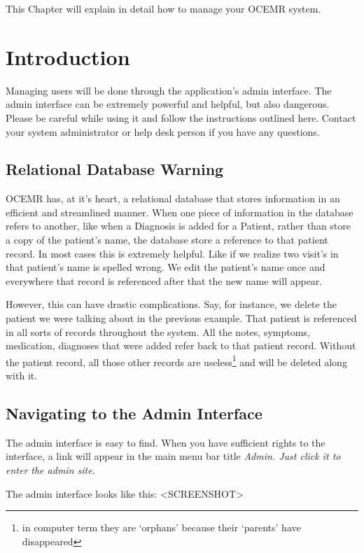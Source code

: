 This Chapter will explain in detail how to manage your OCEMR system.

\section{Introduction}

Managing users will be done through the application’s admin interface.
The admin interface can be extremely powerful and helpful, but also
dangerous. Please be careful while using it and follow the instructions
outlined here. Contact your system administrator or help desk person if
you have any questions.

\subsection{Relational Database Warning}

  OCEMR has, at it’s heart, a relational database that stores information
in an efficient and streamlined manner. When one piece of information in
the database refers to another, like when a Diagnosis is added for a Patient,
rather than store a copy of the patient’s name, the database store a reference
to that patient record. In most cases this is extremely helpful. Like if we
realize two visit’s in that patient’s name is spelled wrong. We edit the
patient’s name once and everywhere that record is referenced after that the
new name will appear.

  However, this can have drastic complications. Say, for instance, we delete
the patient we were talking about in the previous example. That patient is
referenced in all sorts of records throughout the system. All the notes,
symptoms, medication, diagnoses that were added refer back to that patient
record. Without the patient record, all those other records are
useless\footnote{ in computer term they are ‘orphans’ because their
‘parents’ have disappeared } and will be deleted along with it.

\subsection{Navigating to the Admin Interface}

The admin interface is easy to find. When you have sufficient rights
to the interface, a link will appear in the main menu bar title \em{Admin}.
Just click it to enter the admin site.

  The admin interface looks like this: <SCREENSHOT>

